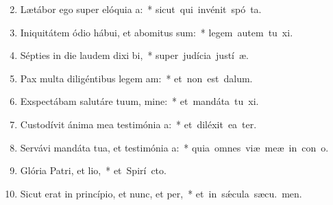 \begin{flushleft}
\begin{enumerate}[leftmargin=*]
\setcounter{enumi}{1}

\item Lætábor ego super elóquia a:~* \mbox{sicut qui invénit spó ta.}
\item Iniquitátem ódio hábui, et abomitus sum:~* \mbox{legem autem tu xi.}
\item Sépties in die laudem dixi bi,~* \mbox{super judícia justí æ.}
\item Pax multa diligéntibus legem am:~* \mbox{et non est  dalum.}
\item Exspectábam salutáre tuum, mine:~* \mbox{et mandáta tu xi.}
\item Custodívit ánima mea testimónia a:~* \mbox{et diléxit ea ter.}
\item Servávi mandáta tua, et testimónia a:~* \mbox{quia omnes viæ meæ in con o.}
\item Glória Patri, et lio,~* \mbox{et Spirí cto.}
\item Sicut erat in princípio, et nunc, et per,~* \mbox{et in s\'{\ae}cula sæcu. men.}


\end{enumerate}
\end{flushleft}

